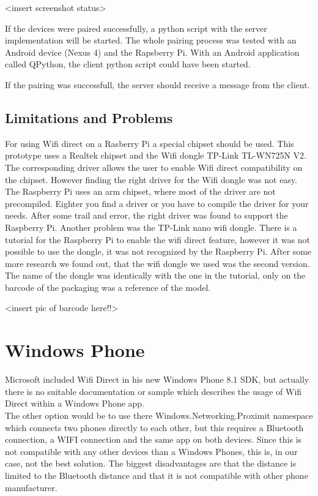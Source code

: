 <insert screenshot status>

If the devices were paired successfully, a python script with the server implementation will be started.
The whole pairing process was tested with an Android device (Nexus 4) and the Rapsberry Pi. With an Android application called QPython, the client python script could have been started.

If the pairing was successfull, the server should receive a message from the client.

\subsection*{Limitations and Problems}
\label{subsec:RaspberryLimitationsProblems}
For using Wifi direct on a Rasberry Pi a special chipset should be used. This prototype uses a Realtek chipset and the Wifi dongle TP-Link TL-WN725N V2. The corresponding driver allows the user to enable Wifi direct compatibility on the chipset. However finding the right driver for the Wifi dongle was not easy. The Raspberry Pi uses an arm chipset, where most of the driver are not precompiled. Eighter you find a driver or you have to compile the driver for your needs. After some trail and error, the right driver was found to support the Raspberry Pi. Another problem was the TP-Link nano wifi dongle. There is  a tutorial for the Raspberry Pi to enable the wifi direct feature, however it was not possible to use the dongle, it was not recognized by the Raspberry Pi. After some more research we found out, that the wifi dongle we used was the second version. The name of the dongle was identically with the one in the tutorial, only on the barcode of the packaging was a reference of the model.

<insert pic of barcode here!!>




\section{Windows Phone}
\label{sec:WindowsPhone}
Microsoft included Wifi Direct in his new Windows Phone 8.1 SDK, but actually there is no suitable documentation or sample which describes the usage of Wifi Direct within a Windows Phone app.\\
The other option would be to use there Windows.Networking.Proximit namespace which connects two phones directly to each other, but this requires a Bluetooth connection, a WIFI connection and the same app on both devices. Since this is not compatible with any other devices than a Windows Phones, this is, in our case, not the best solution. The biggest disadvantages are that the distance is limited to the Bluetooth distance and that it is not compatible with other phone manufacturer.